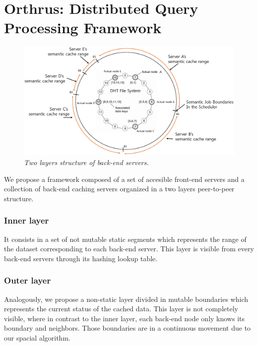 \section{Orthrus: Distributed Query Processing Framework}


\begin{figure}
\centering \includegraphics[width=.48\textwidth]{arch.eps}
\caption{\textit{Two layers structure of back-end servers.}}
\label{fig:fig1}
\end{figure}




We propose a framework composed of a set of accesible front-end servers 
and a collection of back-end caching servers organized in a two layers peer-to-peer structure.




\subsubsection{Inner layer}
It consists in a set of not mutable static segments which represents the range of the dataset corresponding
to each back-end server. This layer is visible from every back-end servers through its hashing lookup table.

\subsubsection{Outer layer}
Analogously, we propose a non-static layer divided in mutable boundaries which 
represents the current status of the cached data. This layer is not completely visible, where
in contrast to the inner layer, each back-end node only knows its boundary and neighbors.
Those boundaries are in a continuous movement due to our spacial algorithm.

